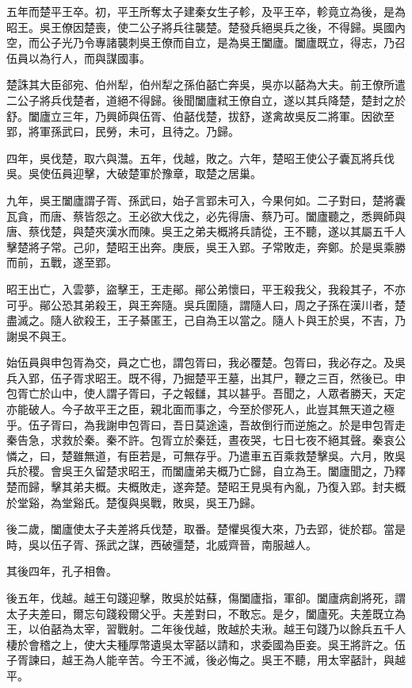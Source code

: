 五年而楚平王卒。初，平王所奪太子建秦女生子軫，及平王卒，軫竟立為後，是為昭王。吳王僚因楚喪，使二公子將兵往襲楚。楚發兵絕吳兵之後，不得歸。吳國內空，而公子光乃令專諸襲刺吳王僚而自立，是為吳王闔廬。闔廬既立，得志，乃召伍員以為行人，而與謀國事。

楚誅其大臣郤宛、伯州犁，伯州犁之孫伯嚭亡奔吳，吳亦以嚭為大夫。前王僚所遣二公子將兵伐楚者，道絕不得歸。後聞闔廬弒王僚自立，遂以其兵降楚，楚封之於舒。闔廬立三年，乃興師與伍胥、伯嚭伐楚，拔舒，遂禽故吳反二將軍。因欲至郢，將軍孫武曰，民勞，未可，且待之。乃歸。

四年，吳伐楚，取六與灊。五年，伐越，敗之。六年，楚昭王使公子囊瓦將兵伐吳。吳使伍員迎擊，大破楚軍於豫章，取楚之居巢。

九年，吳王闔廬謂子胥、孫武曰，始子言郢未可入，今果何如。二子對曰，楚將囊瓦貪，而唐、蔡皆怨之。王必欲大伐之，必先得唐、蔡乃可。闔廬聽之，悉興師與唐、蔡伐楚，與楚夾漢水而陳。吳王之弟夫概將兵請從，王不聽，遂以其屬五千人擊楚將子常。己卯，楚昭王出奔。庚辰，吳王入郢。子常敗走，奔鄭。於是吳乘勝而前，五戰，遂至郢。

昭王出亡，入雲夢，盜擊王，王走鄖。鄖公弟懷曰，平王殺我父，我殺其子，不亦可乎。鄖公恐其弟殺王，與王奔隨。吳兵圍隨，謂隨人曰，周之子孫在漢川者，楚盡滅之。隨人欲殺王，王子綦匿王，己自為王以當之。隨人卜與王於吳，不吉，乃謝吳不與王。

始伍員與申包胥為交，員之亡也，謂包胥曰，我必覆楚。包胥曰，我必存之。及吳兵入郢，伍子胥求昭王。既不得，乃掘楚平王墓，出其尸，鞭之三百，然後已。申包胥亡於山中，使人謂子胥曰，子之報讎，其以甚乎。吾聞之，人眾者勝天，天定亦能破人。今子故平王之臣，親北面而事之，今至於僇死人，此豈其無天道之極乎。伍子胥曰，為我謝申包胥曰，吾日莫途遠，吾故倒行而逆施之。於是申包胥走秦告急，求救於秦。秦不許。包胥立於秦廷，晝夜哭，七日七夜不絕其聲。秦哀公憐之，曰，楚雖無道，有臣若是，可無存乎。乃遣車五百乘救楚擊吳。六月，敗吳兵於稷。會吳王久留楚求昭王，而闔廬弟夫概乃亡歸，自立為王。闔廬聞之，乃釋楚而歸，擊其弟夫概。夫概敗走，遂奔楚。楚昭王見吳有內亂，乃復入郢。封夫概於堂谿，為堂谿氏。楚復與吳戰，敗吳，吳王乃歸。

後二歲，闔廬使太子夫差將兵伐楚，取番。楚懼吳復大來，乃去郢，徙於鄀。當是時，吳以伍子胥、孫武之謀，西破彊楚，北威齊晉，南服越人。

其後四年，孔子相魯。

後五年，伐越。越王句踐迎擊，敗吳於姑蘇，傷闔廬指，軍卻。闔廬病創將死，謂太子夫差曰，爾忘句踐殺爾父乎。夫差對曰，不敢忘。是夕，闔廬死。夫差既立為王，以伯嚭為太宰，習戰射。二年後伐越，敗越於夫湫。越王句踐乃以餘兵五千人棲於會稽之上，使大夫種厚幣遺吳太宰嚭以請和，求委國為臣妾。吳王將許之。伍子胥諫曰，越王為人能辛苦。今王不滅，後必悔之。吳王不聽，用太宰嚭計，與越平。


